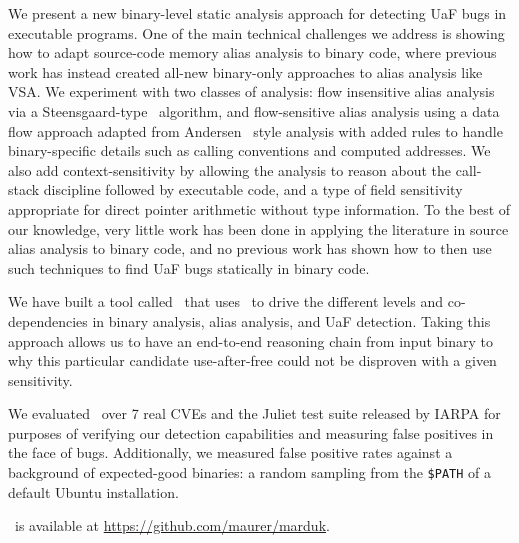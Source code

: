 We present a new binary-level static analysis approach for detecting UaF bugs in executable programs.
One of the main technical challenges we address is showing how to adapt source-code memory alias analysis to binary code, where previous work has instead created all-new binary-only approaches to alias
analysis like VSA.
We experiment with two classes of analysis: flow insensitive alias analysis via a Steensgaard-type~\cite{steensgaard-alias} algorithm, and  flow-sensitive alias analysis using a data flow approach adapted from Andersen~\cite{andersen} style analysis with added rules to handle binary-specific details such as calling conventions and computed addresses.
We also add context-sensitivity by allowing the analysis to reason about the call-stack discipline followed by executable code, and a type of field sensitivity appropriate for direct pointer arithmetic without type information.
To the best of our knowledge, very little work has been done in applying the literature in source alias analysis to binary code, and no previous work has shown how to then use such techniques to find UaF bugs statically in binary code.

We have built a tool called \aliasname\ that uses \sysname\ to drive the different levels and co-dependencies in binary analysis, alias analysis, and UaF detection.
Taking this approach allows us to have an end-to-end reasoning chain from input binary to why this particular candidate use-after-free could not be disproven with a given sensitivity.

We evaluated \aliasname\ over 7 real CVEs and the Juliet test suite released by IARPA for purposes of verifying our detection capabilities and measuring false positives in the face of bugs.
Additionally, we measured false positive rates against a background of expected-good binaries: a random sampling from the \texttt{\$PATH} of a default Ubuntu installation.

\aliasname\ is available at \url{https://github.com/maurer/marduk}.
